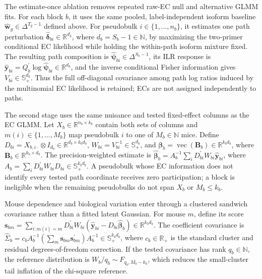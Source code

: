 \documentclass[11pt]{article}
\newcommand{\Beta}{\bm B}
\begin{document}
The estimate-once ablation removes repeated raw-EC null and alternative GLMM fits. For each block \(b\), it uses the same pooled, label-independent isoform baseline \(\widehat{\bm w}_g\in\Delta^{T_g-1}\) defined above. For pseudobulk \(i\in\{1,\ldots,n_b\}\), it estimates one path perturbation \(\widehat{\bm\delta}_{bi}\in\mathbb R^{d_b}\), where \(d_b=S_b-1\in\mathbb N\), by maximizing the two-primer conditional EC likelihood while holding the within-path isoform mixture fixed. The resulting path composition is \(\widehat{\bm\psi}_{bi}\in\Delta^{S_b-1}\), its ILR response is \(\widehat{\bm y}_{bi}=Q_b^\prime\log\widehat{\bm\psi}_{bi}\in\mathbb R^{d_b}\), and the inverse conditional Fisher information gives \(V_{bi}\in\mathbb S_+^{d_b}\). Thus the full off-diagonal covariance among path log ratios induced by the multinomial EC likelihood is retained; ECs are not assigned independently to paths.

The second stage uses the same nuisance and tested fixed-effect columns as the EC GLMM. Let \(X_b\in\mathbb R^{n_b\times k_b}\) contain both sets of columns and \(m(i)\in\{1,\ldots,M_b\}\) map pseudobulk \(i\) to one of \(M_b\in\mathbb N\) mice. Define \(D_{bi}=X_{b,i\mathbin\cdot}\otimes I_{d_b}\in\mathbb R^{d_b\times k_bd_b}\), \(W_{bi}=V_{bi}^{-1}\in\mathbb S_+^{d_b}\), and \(\bm\beta_b=\operatorname{vec}(\Beta_b)\in\mathbb R^{k_bd_b}\), where \(\Beta_b\in\mathbb R^{k_b\times d_b}\). The precision-weighted estimate is \(\widehat{\bm\beta}_b=A_b^{-1}\sum_iD_{bi}^\prime W_{bi}\widehat{\bm y}_{bi}\), where \(A_b=\sum_iD_{bi}^\prime W_{bi}D_{bi}\in\mathbb S_+^{k_bd_b}\). A pseudobulk whose EC information does not identify every tested path coordinate receives zero participation; a block is ineligible when the remaining pseudobulks do not span \(X_b\) or \(M_b\leq k_b\).

Mouse dependence and biological variation enter through a clustered sandwich covariance rather than a fitted latent Gaussian. For mouse \(m\), define its score \(\bm s_{bm}=\sum_{i:m(i)=m}D_{bi}^\prime W_{bi}(\widehat{\bm y}_{bi}-D_{bi}\widehat{\bm\beta}_b)\in\mathbb R^{k_bd_b}\). The coefficient covariance is \(\widehat\Sigma_b=c_bA_b^{-1}(\sum_m\bm s_{bm}\bm s_{bm}^\prime)A_b^{-1}\in\mathbb S_+^{k_bd_b}\), where \(c_b\in\mathbb R_+\) is the standard cluster and residual degrees-of-freedom correction. If the tested covariance has rank \(q_b\in\mathbb N\), the reference distribution is \(W_b/q_b\sim F_{q_b,M_b-k_b}\), which reduces the small-cluster tail inflation of the chi-square reference.
\end{document}
